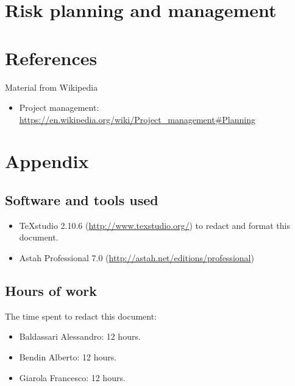 \documentclass[a4paper,11pt]{report} %
\begin{document}
	\section{Risk planning and management}	

	\pagebreak
	\section{References}
		Material from Wikipedia
		\begin{itemize}
			\item Project management: \href{https://en.wikipedia.org/wiki/Project\_management\#Planning}{https://en.wikipedia.org/wiki/Project\_management\#Planning}
		\end{itemize}
	
	\section{Appendix}
		\subsection{Software and tools used}
		\begin{itemize}
			\item TeXstudio 2.10.6 (\href{http://www.texstudio.org/}{http://www.texstudio.org/}) to redact and format this document.
			\item Astah Professional 7.0 (\href{http://astah.net/editions/professional}{http://astah.net/editions/professional}) 
		\end{itemize}
		
		\subsection{Hours of work} The time spent to redact this document:
		\begin{itemize}
			\item Baldassari Alessandro: 12 hours.
			\item Bendin Alberto: 12 hours.
			\item Giarola Francesco: 12 hours.
		\end{itemize}
\end{document}
